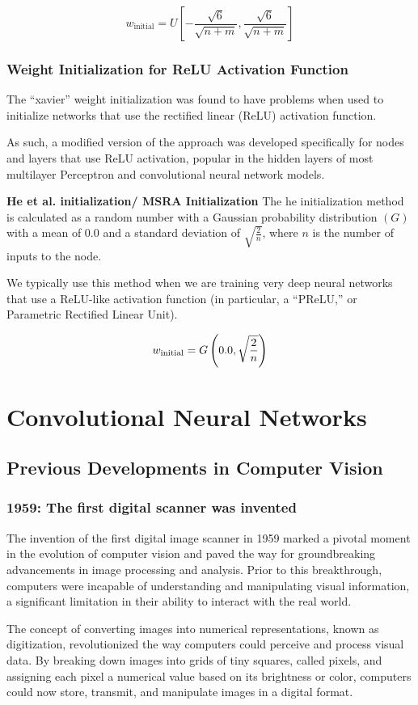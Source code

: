 \documentclass{report}
\begin{document}
\[ w_\text{initial} = U\left[ -\frac{\sqrt{6}}{\sqrt{n + m}}, \frac{\sqrt{6}}{\sqrt{n + m}} \right] \]

\subsection{Weight Initialization for ReLU Activation Function}

The “xavier” weight initialization was found to have problems when used to initialize networks that use the rectified linear (ReLU) activation function.

As such, a modified version of the approach was developed specifically for nodes and layers that use ReLU activation, popular in the hidden layers of most multilayer Perceptron and convolutional neural network models.

\textbf{He et al. initialization/ MSRA Initialization}
The he initialization method is calculated as a random number with a Gaussian probability distribution $(G)$ with a mean of 0.0 and a standard deviation of $\sqrt{\frac{2}{n}}$, where $n$ is the number of inputs to the node.

We typically use this method when we are training very deep neural networks that use a ReLU-like activation function (in particular, a “PReLU,” or Parametric Rectified Linear Unit).

$$w_\text{initial} = G\left(0.0, \sqrt{\frac{2}{n}}\right)$$

\chapter{Convolutional Neural Networks}

\section{Previous Developments in Computer Vision}
\subsection{1959: The first digital scanner was invented}
The invention of the first digital image scanner in 1959 marked a pivotal moment in the evolution of computer vision and paved the way for groundbreaking advancements in image processing and analysis. Prior to this breakthrough, computers were incapable of understanding and manipulating visual information, a significant limitation in their ability to interact with the real world.

The concept of converting images into numerical representations, known as digitization, revolutionized the way computers could perceive and process visual data. By breaking down images into grids of tiny squares, called pixels, and assigning each pixel a numerical value based on its brightness or color, computers could now store, transmit, and manipulate images in a digital format.
\end{document}
